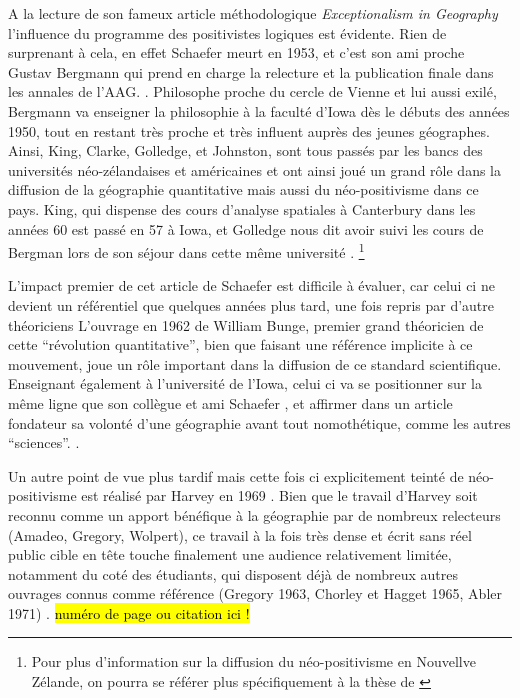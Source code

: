 A la lecture de son fameux article méthodologique \textit{Exceptionalism in Geography} l'influence du programme des positivistes logiques est évidente. Rien de surprenant à cela, en effet Schaefer meurt en 1953, et c'est son ami proche Gustav Bergmann qui prend en charge la relecture et la publication finale dans les annales de l'AAG. \autocite[32]{Gregory1978}. Philosophe proche du cercle de Vienne et lui aussi exilé, Bergmann va enseigner la philosophie à la faculté d'Iowa dès le débuts des années 1950, tout en restant très proche et très influent auprès des jeunes géographes.\autocite[192]{Buttimer1983} Ainsi, King, Clarke, Golledge, et Johnston, sont tous passés par les bancs des universités néo-zélandaises et américaines et ont ainsi joué un grand rôle dans la diffusion de la géographie quantitative mais aussi du néo-positivisme dans ce pays. King, qui dispense des cours d'analyse spatiales à Canterbury dans les années 60 est passé en 57 à Iowa, et Golledge nous dit avoir suivi les cours de Bergman lors de son séjour dans cette même université \autocite[95-96]{Bailly2000}. \footnote{Pour plus d'information sur la diffusion du néo-positivisme en Nouvellve Zélande, on pourra se référer plus spécifiquement à la thèse de \textcite{Hammond1992}}

L'impact premier de cet article de Schaefer est difficile à évaluer, car celui ci ne devient un référentiel que quelques années plus tard, une fois repris par d'autre théoriciens \autocite[32]{Gregory1978} L'ouvrage en 1962 de William Bunge, premier grand théoricien de cette \enquote{révolution quantitative}, bien que faisant une référence implicite à ce mouvement, joue un rôle important dans la diffusion de ce standard scientifique. Enseignant également à l'université de l'Iowa, celui ci va se positionner sur la même ligne que son collègue et ami Schaefer \autocite{Goodchild2001}, et affirmer dans un article fondateur \autocite{Bunge1962} sa volonté d'une géographie avant tout nomothétique, comme les autres \enquote{sciences}. \autocite{Bunge1979} \autocite{Claval2003} \autocite[429-430]{Gregory2009}. 

Un autre point de vue plus tardif mais cette fois ci explicitement teinté de néo-positivisme est réalisé par Harvey en 1969 \autocite{Harvey1969}. Bien que le travail d'Harvey soit reconnu comme un apport bénéfique à la géographie par de nombreux relecteurs (Amadeo, Gregory, Wolpert), ce travail à la fois très dense et écrit sans réel public cible en tête touche finalement une audience relativement limitée, notamment du coté des étudiants, qui disposent déjà de nombreux autres ouvrages connus comme référence (Gregory 1963, Chorley et Hagget 1965, Abler 1971) \autocite{Johnston2008}. \hl{numéro de page ou citation ici !}


